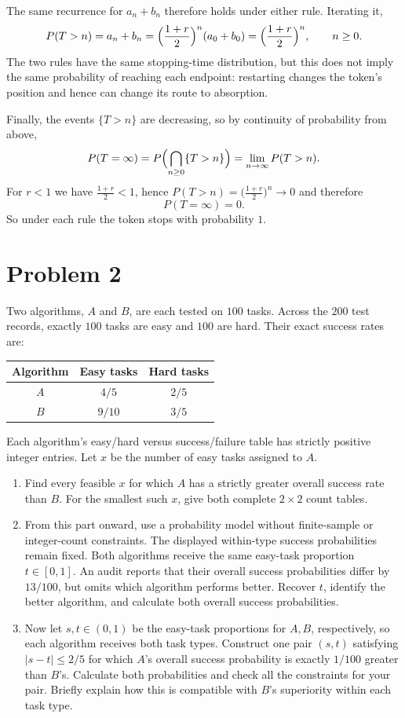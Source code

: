 \documentclass[11pt,a4paper]{article}
\newcommand{\Prob}{P}
\begin{document}
\begin{enumerate}
The same recurrence for $a_n+b_n$ therefore holds under either rule.
Iterating it,
\[
\Prob(T>n)=a_n+b_n=\Bigl(\frac{1+r}{2}\Bigr)^{n}(a_0+b_0)
=\Bigl(\frac{1+r}{2}\Bigr)^{n},
\qquad n\ge0 .
\]
The two rules have the same stopping-time distribution, but this does not
imply the same probability of reaching each endpoint: restarting changes
the token's position and hence can change its route to absorption.

Finally, the events
$\{T>n\}$ are decreasing, so by continuity of probability from above,
\[
\Prob(T=\infty)=\Prob\Bigl(\bigcap_{n\ge0}\{T>n\}\Bigr)
=\lim_{n\to\infty}\Prob(T>n).
\]
For $r<1$ we have $\frac{1+r}{2}<1$, hence
$\Prob(T>n)=\bigl(\frac{1+r}{2}\bigr)^{n}\to0$ and therefore
\[
\Prob(T=\infty)=0 .
\]
So under each rule the token stops with probability $1$.
\end{enumerate}

\clearpage
\section*{Problem 2}
Two algorithms, $A$ and $B$, are each tested on $100$ tasks. Across the $200$ test records, exactly $100$ tasks are easy and $100$ are hard. Their exact success rates are:
\begin{center}
\begin{tabular}{ccc}
\toprule Algorithm & Easy tasks & Hard tasks\\\midrule
$A$ & $4/5$ & $2/5$\\
$B$ & $9/10$ & $3/5$\\\bottomrule
\end{tabular}
\end{center}
Each algorithm's easy/hard versus success/failure table has strictly positive integer entries. Let $x$ be the number of easy tasks assigned to $A$.
\begin{enumerate}
\item Find every feasible $x$ for which $A$ has a strictly greater overall success rate than $B$. For the smallest such $x$, give both complete $2\times2$ count tables.
\item From this part onward, use a probability model without finite-sample or integer-count constraints. The displayed within-type success probabilities remain fixed. Both algorithms receive the same easy-task proportion $t\in[0,1]$. An audit reports that their overall success probabilities differ by $13/100$, but omits which algorithm performs better. Recover $t$, identify the better algorithm, and calculate both overall success probabilities.
\item Now let $s,t\in(0,1)$ be the easy-task proportions for $A,B$, respectively, so each algorithm receives both task types. Construct one pair $(s,t)$ satisfying $|s-t|\leq2/5$ for which $A$'s overall success probability is exactly $1/100$ greater than $B$'s. Calculate both probabilities and check all the constraints for your pair. Briefly explain how this is compatible with $B$'s superiority within each task type.
\end{enumerate}
\end{document}
